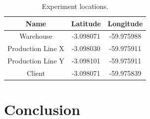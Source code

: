 \documentclass[12pt]{article}
\begin{document}
\begin{table}[H]
\centering
{}
\caption{Mission Flight Time Tested in Real and Virtual UAV.\label{table:tests}}
\end{table}

\begin{table}[H]
\centering
\begin{tabular}{|c|c|c|}
\hline
\bfseries Name & \bfseries Latitude & \bfseries Longitude \\
\hline
Warehouse & -3.098071 & -59.975988 \\
\hline
Production Line X & -3.098030 & -59.975911 \\
\hline
Production Line Y & -3.098101 & -59.975911 \\
\hline
Client & -3.098071 & -59.975839 \\
\hline
\end{tabular}
\caption{Experiment locations.}
\label{table:positions}
\end{table}


\section{Conclusion}
\label{sec:conclusao}
\end{document}
